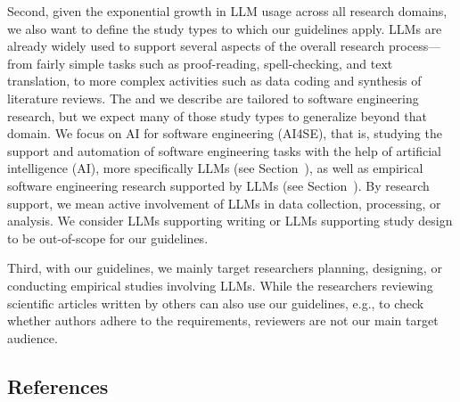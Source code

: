 Second, given the exponential growth in LLM usage across all research domains, we also want to define the study types to which our guidelines apply.
LLMs are already widely used to support several aspects of the overall research process---from fairly simple tasks such as proof-reading, spell-checking, and text translation, to more complex activities such as data coding and synthesis of literature reviews.
The \studytypes and \guidelines we describe are tailored to software engineering research, but we expect many of those study types to generalize beyond that domain.
We focus on AI for software engineering (AI4SE), that is, studying the support and automation of software engineering tasks with the help of artificial intelligence (AI), more specifically LLMs (see Section~\llmsforengineers), as well as empirical software engineering research supported by LLMs (see Section~\llmsforresearcher).
By research support, we mean active involvement of LLMs in data collection, processing, or analysis.
We consider LLMs supporting writing or LLMs supporting study design to be out-of-scope for our guidelines.

Third, with our guidelines, we mainly target researchers planning, designing, or conducting empirical studies involving LLMs.
While the researchers reviewing scientific articles written by others can also use our guidelines, e.g., to check whether authors adhere to the \must requirements, reviewers are not our main target audience.

\subsection{References}





